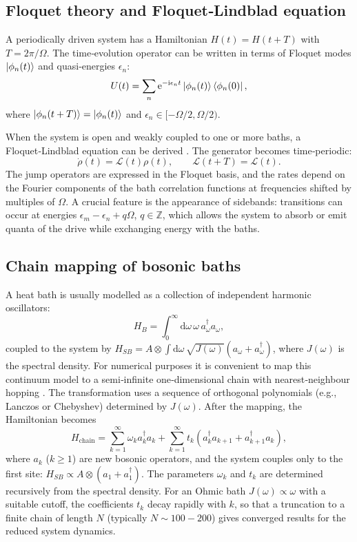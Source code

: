 \documentclass[11pt,a4paper]{article}
\theoremstyle{definition}
\theoremstyle{remark}
\newcommand{\ee}{\mathrm{e}}
\newcommand{\ii}{\mathrm{i}}
\renewcommand{\d}{\mathrm{d}}
\newcommand{\bbZ}{\mathbb{Z}}
\begin{document}
\subsection{Floquet theory and Floquet‑Lindblad equation}\label{sec:Floquet}
A periodically driven system has a Hamiltonian $H(t)=H(t+T)$ with $T=2\pi/\Omega$. The time‑evolution operator can be written in terms of Floquet modes $\ket{\phi_n(t)}$ and quasi‑energies $\epsilon_n$:
\begin{equation}
U(t) = \sum_n \ee^{-\ii \epsilon_n t} \ket{\phi_n(t)}\bra{\phi_n(0)},
\end{equation}
where $\ket{\phi_n(t+T)}=\ket{\phi_n(t)}$ and $\epsilon_n\in[-\Omega/2,\Omega/2)$.

When the system is open and weakly coupled to one or more baths, a Floquet‑Lindblad equation can be derived \cite{Kurizki2015, Brandner2016}. The generator becomes time‑periodic:
\begin{equation}
\dot\rho(t) = \mathcal{L}(t)\rho(t),\qquad \mathcal{L}(t+T)=\mathcal{L}(t).
\end{equation}
The jump operators are expressed in the Floquet basis, and the rates depend on the Fourier components of the bath correlation functions at frequencies shifted by multiples of $\Omega$. A crucial feature is the appearance of sidebands: transitions can occur at energies $\epsilon_m-\epsilon_n + q\Omega$, $q\in\bbZ$, which allows the system to absorb or emit quanta of the drive while exchanging energy with the baths.

\subsection{Chain mapping of bosonic baths}\label{sec:chain}
A heat bath is usually modelled as a collection of independent harmonic oscillators:
\begin{equation}
H_B = \int_0^\infty \d\omega\, \omega\, a_\omega^\dagger a_\omega,
\end{equation}
coupled to the system by $H_{SB} = A\otimes \int \d\omega\, \sqrt{J(\omega)}(a_\omega+a_\omega^\dagger)$, where $J(\omega)$ is the spectral density. For numerical purposes it is convenient to map this continuum model to a semi‑infinite one‑dimensional chain with nearest‑neighbour hopping \cite{Chin2010, Prior2010}. The transformation uses a sequence of orthogonal polynomials (e.g., Lanczos or Chebyshev) determined by $J(\omega)$. After the mapping, the Hamiltonian becomes
\begin{equation}\label{eq:chainH}
H_{\text{chain}} = \sum_{k=1}^\infty \omega_k a_k^\dagger a_k + \sum_{k=1}^\infty t_k (a_k^\dagger a_{k+1} + a_{k+1}^\dagger a_k),
\end{equation}
where $a_k$ ($k\ge1$) are new bosonic operators, and the system couples only to the first site: $H_{SB} \propto A\otimes (a_1 + a_1^\dagger)$. The parameters $\omega_k$ and $t_k$ are determined recursively from the spectral density. For an Ohmic bath $J(\omega)\propto\omega$ with a suitable cutoff, the coefficients $t_k$ decay rapidly with $k$, so that a truncation to a finite chain of length $N$ (typically $N\sim 100-200$) gives converged results for the reduced system dynamics.
\end{document}
